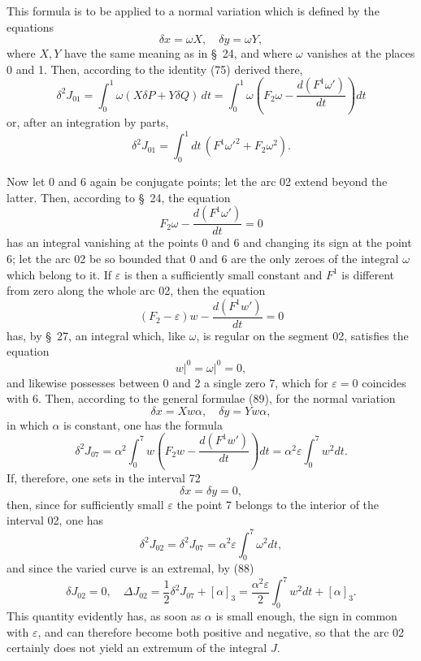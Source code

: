 \documentclass[11pt,a4paper,leqno]{article}
\begin{document}
This formula is to be applied to a normal variation which is defined by the equations
\[
\delta x=\omega X,
\quad
\delta y=\omega Y,
\]
where $X,Y$ have the same meaning as in \S~24, and where $\omega$ vanishes at the places 0 and 1. Then, according to the identity (75) derived there,
\begin{equation}\tag{89}
\delta^2J_{01}=\int_0^1\omega(X\delta P+Y\delta Q)\,dt
=\int_0^1\omega\left(F_2\omega-\frac{d(F^1\omega')}{dt}\right)dt
\end{equation}
or, after an integration by parts,
\begin{equation}\tag{90}
\delta^2J_{01}=\int_0^1dt\,(F^1\omega'^2+F_2\omega^2).
\end{equation}

Now let 0 and 6 again be conjugate points; let the arc 02 extend beyond the latter. Then, according to \S~24, the equation
\begin{equation}\tag{91}
F_2\omega-\frac{d(F^1\omega')}{dt}=0
\end{equation}
has an integral vanishing at the points 0 and 6 and changing its sign at the point 6; let the arc 02 be so bounded that 0 and 6 are the only zeroes of the integral $\omega$ which belong to it. If $\varepsilon$ is then a sufficiently small constant and $F^1$ is different from zero along the whole arc 02, then the equation
\[
(F_2-\varepsilon)w-\frac{d(F^1w')}{dt}=0
\]
has, by \S~27, an integral which, like $\omega$, is regular on the segment 02, satisfies the equation
\[
\left.w\right|^0=\left.\omega\right|^0=0,
\]
and likewise possesses between 0 and 2 a single zero 7, which for $\varepsilon=0$ coincides with 6. Then, according to the general formulae (89), for the normal variation
\[
\delta x=Xw\alpha,
\quad
\delta y=Yw\alpha,
\]
in which $\alpha$ is constant, one has the formula
\[
\delta^2J_{07}=\alpha^2\int_0^7 w\left(F_2w-\frac{d(F^1w')}{dt}\right)dt
=\alpha^2\varepsilon\int_0^7w^2dt.
\]
If, therefore, one sets in the interval 72
\[
\delta x=\delta y=0,
\]
then, since for sufficiently small $\varepsilon$ the point 7 belongs to the interior of the interval 02, one has
\[
\delta^2J_{02}=\delta^2J_{07}=\alpha^2\varepsilon\int_0^7\omega^2dt,
\]
and since the varied curve is an extremal, by (88)
\[
\delta J_{02}=0,
\quad
\Delta J_{02}=\frac12\delta^2J_{07}+[\alpha]_3
=\frac{\alpha^2\varepsilon}{2}\int_0^7w^2dt+[\alpha]_3.
\]
This quantity evidently has, as soon as $\alpha$ is small enough, the sign in common with $\varepsilon$, and can therefore become both positive and negative, so that the arc 02 certainly does not yield an extremum of the integral $J$.
\end{document}
